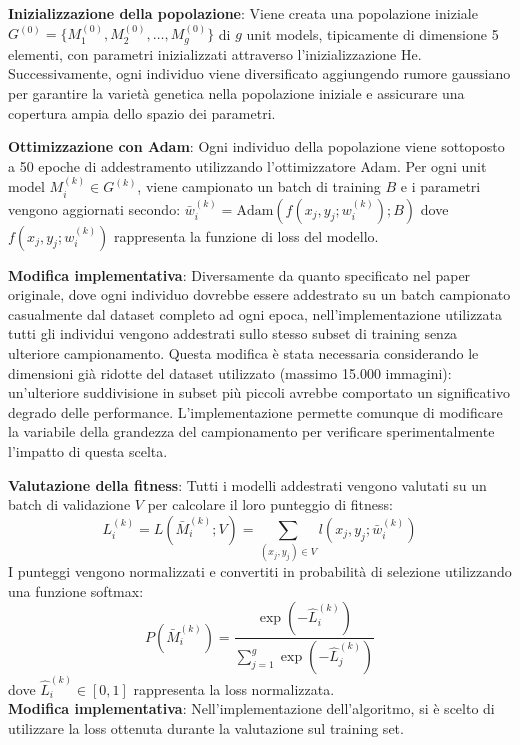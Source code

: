 \begin{compactitemize}
\item \textbf{Inizializzazione della popolazione}: Viene creata una popolazione iniziale\\ $G^{(0)} = \{M_1^{(0)}, M_2^{(0)}, \ldots, M_g^{(0)}\}$ di $g$ unit models, tipicamente di dimensione 5 elementi, con parametri inizializzati attraverso l'inizializzazione He. Successivamente, ogni individuo viene diversificato aggiungendo rumore gaussiano per garantire la varietà genetica nella popolazione iniziale e assicurare una copertura ampia dello spazio dei parametri.
\item \textbf{Ottimizzazione con Adam}: Ogni individuo della popolazione viene sottoposto a 50 epoche di addestramento utilizzando l'ottimizzatore Adam. Per ogni unit model $M_i^{(k)} \in G^{(k)}$, viene campionato un batch di training $B$ e i parametri vengono aggiornati secondo:
$\bar{w}_i^{(k)} = \text{Adam}(f(x_j, y_j; w_i^{(k)}); B)$
dove $f(x_j, y_j; w_i^{(k)})$ rappresenta la funzione di loss del modello. 

\textbf{Modifica implementativa}: Diversamente da quanto specificato nel paper originale, dove ogni individuo dovrebbe essere addestrato su un batch campionato casualmente dal dataset completo ad ogni epoca, nell'implementazione utilizzata tutti gli individui vengono addestrati sullo stesso subset di training senza ulteriore campionamento. Questa modifica è stata necessaria considerando le dimensioni già ridotte del dataset utilizzato (massimo 15.000 immagini): un'ulteriore suddivisione in subset più piccoli avrebbe comportato un significativo degrado delle performance. L'implementazione permette comunque di modificare la variabile della grandezza del campionamento per verificare sperimentalmente l'impatto di questa scelta.
\item \textbf{Valutazione della fitness}: Tutti i modelli addestrati vengono valutati su un batch di validazione $V$ per calcolare il loro punteggio di fitness:
$$L_i^{(k)} = L(\bar{M}_i^{(k)}; V) = \sum_{(x_j,y_j) \in V} l(x_j, y_j; \bar{w}_i^{(k)})$$
I punteggi vengono normalizzati e convertiti in probabilità di selezione utilizzando una funzione softmax:
$$P(\bar{M}_i^{(k)}) = \frac{\exp(-\hat{L}_i^{(k)})}{\sum_{j=1}^g \exp(-\hat{L}_j^{(k)})}$$
dove $\hat{L}_i^{(k)} \in [0,1]$ rappresenta la loss normalizzata.\\
\textbf{Modifica implementativa}: Nell'implementazione dell'algoritmo, si è scelto di utilizzare la loss ottenuta durante la valutazione sul training set.
\end{compactitemize}

